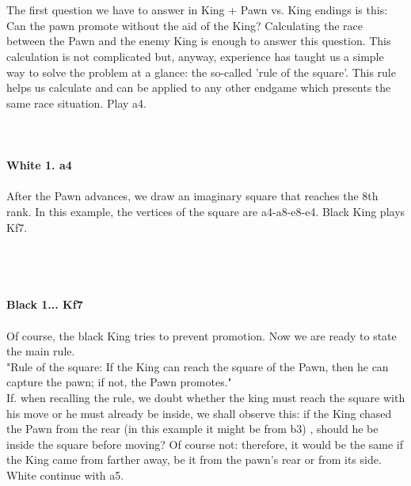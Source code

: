 \documentclass{article}
\begin{document}

\\
\\
The first question we have to answer in King + Pawn vs. King endings is this: Can the pawn promote without the aid of the King? Calculating the race between the Pawn and the enemy King is enough to answer this question. This calculation is not complicated but, anyway, experience has taught us a simple way to solve the problem at a glance: the so-called 'rule of the square'. This rule helps us calculate and can be applied to any other endgame which presents the same race situation. Play a4.\\
\\

\\
\\
\textbf{White 1. a4}\\
\\
After the Pawn advances, we draw an imaginary square that reaches the 8th rank. In this example, the vertices of the square are a4-a8-e8-e4. Black King plays Kf7.\\\\
\\

\\
\\
\textbf{Black 1... Kf7}\\
\\
Of course, the black King tries to prevent promotion. Now we are ready to state the main rule.\\"Rule of the square: If the King can reach the square of the Pawn, then he can capture the pawn; if not, the Pawn promotes."\\If. when recalling the rule, we doubt whether the king must reach the square with his move or he must already be inside, we shall observe this: if the King chased the Pawn from the rear (in this example it might be from b3) , should he be inside the square before moving? Of course not: therefore, it would be the same if the King came from farther away, be it from the pawn's rear or from its side.\\White continue with a5.\\\\
\\

\\
\end{document}
